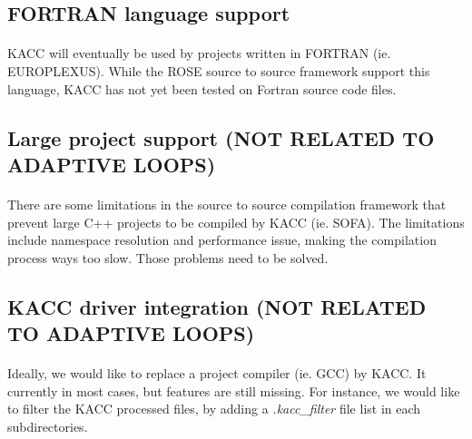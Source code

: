 \documentclass[a4paper, 11pt]{article}
\begin{document}
\subsection{FORTRAN language support}
\paragraph{}
KACC will eventually be used by projects written in FORTRAN (ie. EUROPLEXUS). While the
ROSE source to source framework support this language, KACC has not yet been tested on
Fortran source code files.

\subsection{Large project support (NOT RELATED TO ADAPTIVE LOOPS)}
\paragraph{}
There are some limitations in the source to source compilation framework that prevent
large C++ projects to be compiled by KACC (ie. SOFA). The limitations include namespace
resolution and performance issue, making the compilation process ways too slow. Those
problems need to be solved.

\subsection{KACC driver integration (NOT RELATED TO ADAPTIVE LOOPS)}
\paragraph{}
Ideally, we would like to replace a project compiler (ie. GCC) by KACC. It currently
in most cases, but features are still missing. For instance, we would like to filter
the KACC processed files, by adding a \textit{.kacc\_filter} file list in each subdirectories.
\end{document}
